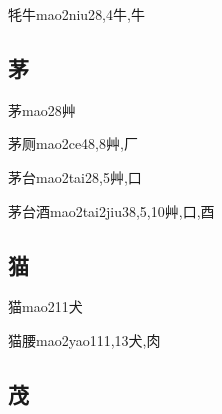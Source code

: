 \begin{EntryWithPhonetic}{牦牛}{mao2niu2}{8,4}{⽜,⽜}
\end{EntryWithPhonetic}

\subsection*{茅}

\begin{EntryWithPhonetic}{茅}{mao2}{8}{⾋}
\end{EntryWithPhonetic}

\begin{EntryWithPhonetic}{茅厕}{mao2ce4}{8,8}{⾋,⼚}
\end{EntryWithPhonetic}

\begin{EntryWithPhonetic}{茅台}{mao2tai2}{8,5}{⾋,⼝}
\end{EntryWithPhonetic}

\begin{EntryWithPhonetic}{茅台酒}{mao2tai2jiu3}{8,5,10}{⾋,⼝,⾣}
\end{EntryWithPhonetic}

\subsection*{猫}

\begin{EntryWithPhonetic}{猫}{mao2}{11}{⽝}
\end{EntryWithPhonetic}

\begin{EntryWithPhonetic}{猫腰}{mao2yao1}{11,13}{⽝,⾁}
\end{EntryWithPhonetic}

\subsection*{茂}

